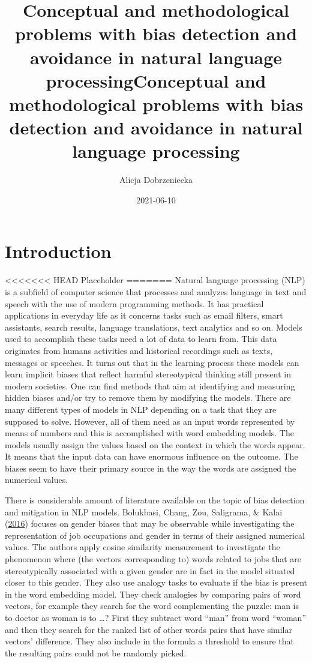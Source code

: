 \documentclass[12pt,]{book}
\title{Conceptual and methodological problems with bias detection and avoidance in natural language processing}
\title{Conceptual and methodological problems with bias detection and avoidance
in natural language processing}
\author{Alicja Dobrzeniecka}
\date{2021-06-10}
\begin{document}
\maketitle

{
\setcounter{tocdepth}{5}
\tableofcontents
}
\chapter{Introduction}\label{introduction}

<<<<<<< HEAD
Placeholder
=======
Natural language processing (NLP) is a subfield of computer science that
processes and analyzes language in text and speech with the use of
modern programming methods. It has practical applications in everyday
life as it concerns tasks such as email filters, smart assistants,
search results, language translations, text analytics and so on. Models
used to accomplish these tasks need a lot of data to learn from. This
data originates from humans activities and historical recordings such as
texts, messages or speeches. It turns out that in the learning process
these models can learn implicit biases that reflect harmful
stereotypical thinking still present in modern societies. One can find
methods that aim at identifying and measuring hidden biases and/or try
to remove them by modifying the models. There are many different types
of models in NLP depending on a task that they are supposed to solve.
However, all of them need as an input words represented by means of
numbers and this is accomplished with word embedding models. The models
usually assign the values based on the context in which the words
appear. It means that the input data can have enormous influence on the
outcome. The biases seem to have their primary source in the way the
words are assigned the numerical values.

There is considerable amount of literature available on the topic of
bias detection and mitigation in NLP models. Bolukbasi, Chang, Zou,
Saligrama, \& Kalai (\protect\hyperlink{ref-Bolukbasi2016Man}{2016})
focuses on gender biases that may be observable while investigating the
representation of job occupations and gender in terms of their assigned
numerical values. The authors apply cosine similarity measurement to
investigate the phenomenon where (the vectors corresponding to) words
related to jobs that are stereotypically associated with a given gender
are in fact in the model situated closer to this gender. They also use
analogy tasks to evaluate if the bias is present in the word embedding
model. They check analogies by comparing pairs of word vectors, for
example they search for the word complementing the puzzle: man is to
doctor as woman is to \ldots{}? First they subtract word ``man'' from
word ``woman'' and then they search for the ranked list of other words
pairs that have similar vectors' difference. They also include in the
formula a threshold to ensure that the resulting pairs could not be
randomly picked.
\end{document}

